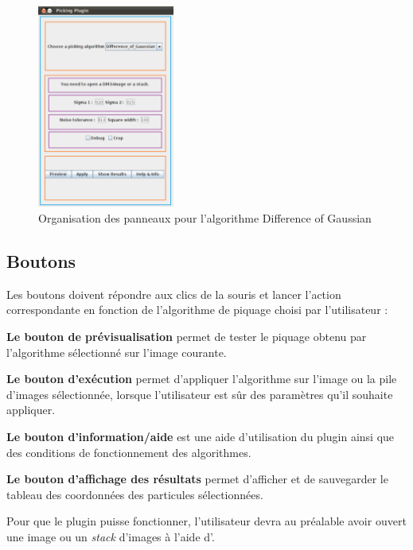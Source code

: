 \begin{figure}[!h] 
\begin{center}
\includegraphics[width=0.4\textwidth]{pluginCadres.png}
\caption{Organisation des panneaux pour l'algorithme Difference of Gaussian}
\label{panneaux}
\end{center}
\end{figure}
\pagebreak

\subsection{Boutons}

Les boutons doivent répondre aux clics de la souris et lancer l'action correspondante en fonction de l'algorithme de piquage choisi par l'utilisateur :

\begin{description}
\item \textbf{Le bouton de prévisualisation} permet de tester le piquage obtenu par l'algorithme sélectionné sur l'image courante.
\item \textbf{Le bouton d'exécution} permet d'appliquer l'algorithme sur l'image ou la pile d'images sélectionnée, lorsque l'utilisateur est s\^ur des paramètres qu'il souhaite appliquer.
\item \textbf{Le bouton d'information/aide} est une aide d'utilisation du plugin ainsi que des conditions de fonctionnement des algorithmes.
\item \textbf{Le bouton d'affichage des résultats} permet d'afficher et de sauvegarder le tableau des coordonnées des particules sélectionnées.%
\end{description}
Pour que le plugin puisse fonctionner, l'utilisateur devra au préalable avoir ouvert une image ou un \textit{stack} d'images à l'aide d'\imj.
\pagebreak

